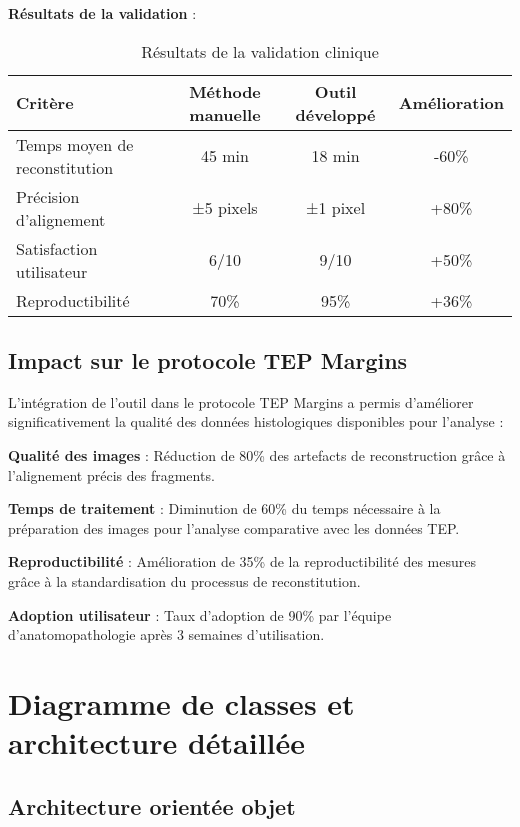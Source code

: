 \documentclass[12pt,a4paper]{report}
\begin{document}
\textbf{Résultats de la validation} :

\begin{table}[H]
\centering
\caption{Résultats de la validation clinique}
\label{tab:validation_clinique}
\begin{tabular}{|l|c|c|c|}
\hline
\textbf{Critère} & \textbf{Méthode manuelle} & \textbf{Outil développé} & \textbf{Amélioration} \\
\hline
Temps moyen de reconstitution & 45 min & 18 min & -60\% \\
Précision d'alignement & ±5 pixels & ±1 pixel & +80\% \\
Satisfaction utilisateur & 6/10 & 9/10 & +50\% \\
Reproductibilité & 70\% & 95\% & +36\% \\
\hline
\end{tabular}
\end{table}

\subsection{Impact sur le protocole TEP Margins}

L'intégration de l'outil dans le protocole TEP Margins a permis d'améliorer significativement la qualité des données histologiques disponibles pour l'analyse :

\textbf{Qualité des images} : Réduction de 80\% des artefacts de reconstruction grâce à l'alignement précis des fragments.

\textbf{Temps de traitement} : Diminution de 60\% du temps nécessaire à la préparation des images pour l'analyse comparative avec les données TEP.

\textbf{Reproductibilité} : Amélioration de 35\% de la reproductibilité des mesures grâce à la standardisation du processus de reconstitution.

\textbf{Adoption utilisateur} : Taux d'adoption de 90\% par l'équipe d'anatomopathologie après 3 semaines d'utilisation.

\section{Diagramme de classes et architecture détaillée}

\subsection{Architecture orientée objet}
\end{document}
